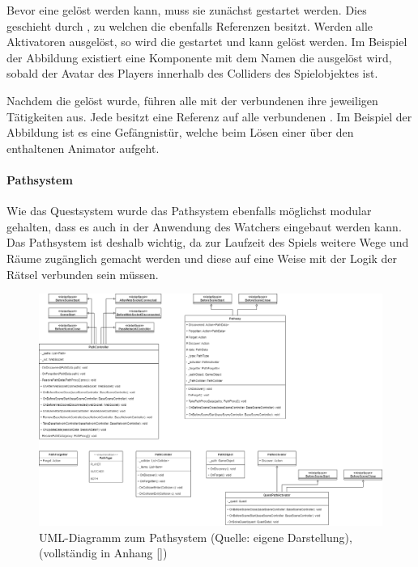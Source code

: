 Bevor eine  gelöst werden kann, muss sie zunächst gestartet werden. Dies geschieht durch , zu welchen die  ebenfalls Referenzen besitzt. Werden alle Aktivatoren ausgelöst, so wird die  gestartet und kann gelöst werden. Im Beispiel der Abbildung existiert eine Komponente mit dem Namen  die ausgelöst wird, sobald der Avatar des Players innerhalb des Colliders des Spielobjektes ist.

Nachdem die  gelöst wurde, führen alle mit der  verbundenen  ihre jeweiligen Tätigkeiten aus. Jede  besitzt eine Referenz auf alle verbundenen . Im Beispiel der Abbildung ist es eine Gefängnistür, welche beim Lösen einer  über den enthaltenen Animator aufgeht.

\paragraph{Pathsystem}\label{sec:path-system}
Wie das Questsystem wurde das Pathsystem ebenfalls möglichst modular gehalten, dass es auch in der Anwendung des Watchers eingebaut werden kann. Das Pathsystem ist deshalb wichtig, da zur Laufzeit des Spiels weitere Wege und Räume zugänglich gemacht werden und diese auf eine Weise mit der Logik der Rätsel verbunden sein müssen.

\begin{figure}[ht]
\centering
\includegraphics[width=1\linewidth]{content/pictures/PathSystem.drawio.png}
\caption{UML-Diagramm zum Pathsystem (Quelle: eigene Darstellung), (vollständig in Anhang \ref{})}
\label{fig:path-system-uml}
\end{figure}

